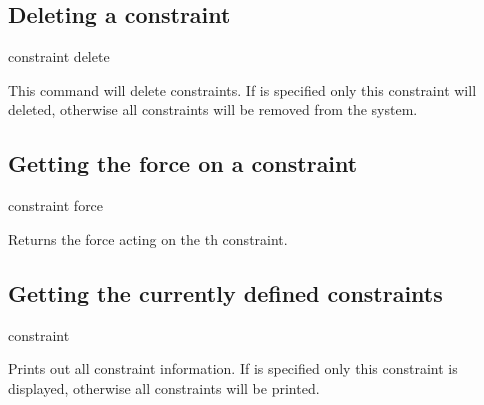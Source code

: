 \subsection{Deleting a constraint}
\begin{essyntax}
  constraint delete  
\end{essyntax}

This command will delete constraints. If  is specified only this
constraint will deleted, otherwise all constraints will be removed from the
system. 

\subsection{Getting the force on a constraint}
\begin{essyntax}
constraint force  
\end{essyntax}
Returns the force acting on the th constraint.


\subsection{Getting the currently defined constraints}
\begin{essyntax}
constraint   
\end{essyntax}
Prints out all constraint information. If  is specified only this
constraint is displayed, otherwise all constraints will be printed.

